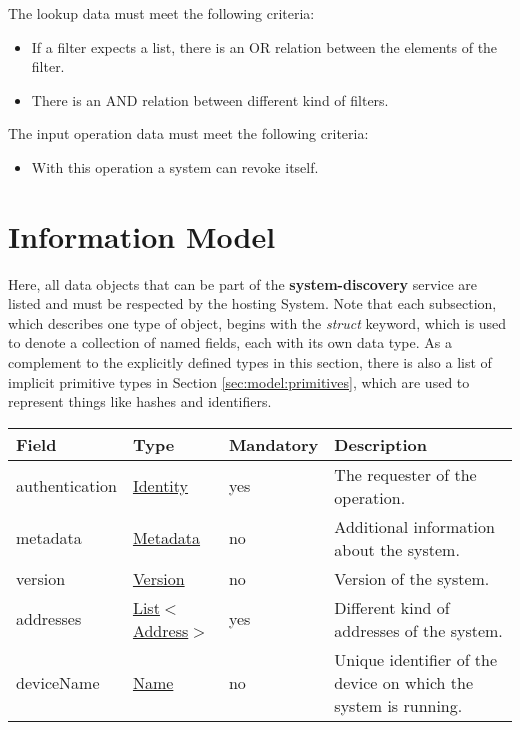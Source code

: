 \documentclass[a4paper]{arrowhead}
\newcommand{\pref}[1]{{\textcolor{ArrowheadGrey}{\hyperref[sec:model:primitives:#1]{#1}}}}
\begin{document}

The lookup data must meet the following criteria:

\begin{itemize}
    \item If a filter expects a list, there is an OR relation between the elements of the filter.
    \item There is an AND relation between different kind of filters.
\end{itemize}


The input operation data must meet the following criteria:

\begin{itemize}
    \item With this operation a system can revoke itself.
\end{itemize}


\clearpage

\section{Information Model}
\label{sec:model}

Here, all data objects that can be part of the \textbf{system-discovery} service are listed and must be respected by the hosting System.
Note that each subsection, which describes one type of object, begins with the \textit{struct} keyword, which is used to denote a collection of named fields, each with its own data type.
As a complement to the explicitly defined types in this section, there is also a list of implicit primitive types in Section \ref{sec:model:primitives}, which are used to represent things like hashes and identifiers.

\label{sec:model:SystemRegistrationRequest}
 
\begin{table}[ht!]
\begin{tabularx}{\textwidth}{| p{3cm} | p{3cm} | p{2cm} | X |} \hline
\rowcolor{gray!33} Field & Type & Mandatory & Description \\ \hline
authentication & \hyperref[sec:model:Identity]{Identity} & yes & The requester of the operation. \\ \hline
metadata &\hyperref[sec:model:Metadata]{Metadata} & no & Additional information about the system. \\ \hline
version &\pref{Version} & no & Version of the system. \\ \hline
addresses &  \pref{List}$<$\pref{Address}$>$ & yes & Different kind of addresses of the system.  \\ \hline
deviceName & \pref{Name} & no & Unique identifier of the device on which the system is running. \\ \hline
\end{tabularx}
\end{table}
\end{document}
